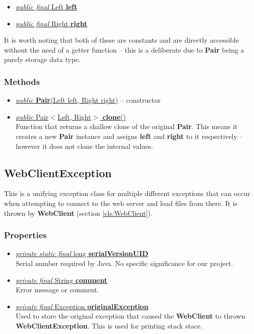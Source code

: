 \documentclass{article}
\newcommand{\sref}[1]{(section \ref{#1})}
\newcommand{\method}[4]{\underline{\textit{#1} #2 \textbf{#3}(#4)}}
\newcommand{\prop}[3]{\underline{\textit{#1} #2 \textbf{#3}}}
\begin{document}
\begin{itemize}
\item \prop{public final}{Left}{left}
\item \prop{public final}{Right}{right}
\end{itemize}

It is worth noting that both of these are constants and are directly accessible without the need of a getter function -- this is a deliberate due to \textbf{Pair} being a purely storage data type.

\subsubsection*{Methods}

\begin{itemize}
\item \underline{\textit{public} \textbf{Pair}(Left left, Right right)} -- constructor
\item \method{public}{Pair$<$Left, Right$>$}{clone}{} \\
  Function that returns a shallow clone of the original \textbf{Pair}. This means it creates a new \textbf{Pair} instance and assigns \textbf{left} and \textbf{right} to it respectively -- however it does not clone the internal values.
\end{itemize}


\subsection{WebClientException}
\label{cls:WebClientException}

This is a unifying exception class for multiple different exceptions that can occur when attempting to connect to the web server and load files from there. It is thrown by \textbf{WebClient} \sref{cls:WebClient}.

\subsubsection*{Properties}

\begin{itemize}
\item \prop{private static final}{long}{serialVersionUID} \\
  Serial number required by Java. No specific significance for our project.
\item \prop{private final}{String}{comment} \\
  Error message or comment.
\item \prop{private final}{Exception}{originalException} \\
  Used to store the original exception that caused the \textbf{WebClient} to thrown \textbf{WebClientException}. This is used for printing stack stace.
\end{itemize}
\end{document}
